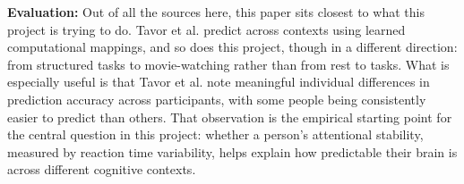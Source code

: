 \documentclass[12pt]{article}
\begin{document}
\textbf{Evaluation:} Out of all the sources here, this paper sits closest to what this project is trying to do. Tavor et al. predict across contexts using learned computational mappings, and so does this project, though in a different direction: from structured tasks to movie-watching rather than from rest to tasks. What is especially useful is that Tavor et al. note meaningful individual differences in prediction accuracy across participants, with some people being consistently easier to predict than others. That observation is the empirical starting point for the central question in this project: whether a person's attentional stability, measured by reaction time variability, helps explain how predictable their brain is across different cognitive contexts.

\printbibliography[title={References}]
\end{document}
